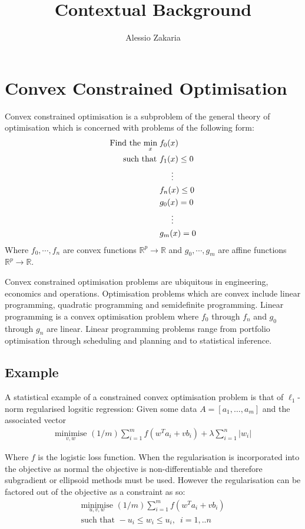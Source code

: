 \documentclass[a4paper,10pt]{article}
\date{}
\author{Alessio Zakaria}
\title{Contextual Background\vspace{-30mm}}
\def\rnum{\mathbb{R}}
\begin{document}
\maketitle
\section{Convex Constrained Optimisation}
Convex constrained optimisation is a subproblem of the general theory of
optimisation which is concerned with problems of the following form:
{\footnotesize
\begin{align*}
    \text{Find the }\underset{x}{\text{min}}\; &f_{0}(x) \\
    \text{  such that }&f_{1}(x) \leq 0 \\
    & \hspace{5mm} \vdots \\
    &f_{n}(x) \leq 0 \\
    &g_{0}(x) = 0 \\
    &\hspace{5mm} \vdots \\
    &g_{m}(x) = 0
\end{align*}}
Where $f_0,\cdots, f_n$ are convex functions $\rnum^{p} \rightarrow \rnum$ and
$g_0, \cdots, g_m$ are affine functions $\rnum^{p} \rightarrow \rnum$.

Convex constrained optimisation problems are ubiquitous in engineering,
economics and operations. Optimisation problems which are convex include linear
programming, quadratic programming and semidefinite programming. Linear
programming is a convex optimisation problem where $f_{0}$ through $f_{n}$ and
$g_{0}$ through $g_{n}$ are linear. Linear programming problems range from
portfolio optimisation through scheduling and planning
 and to statistical inference.
\subsection{Example}
A statistical example of a
constrained convex optimisation problem is that of $\ell_{1}$-norm regularised
logsitic regression: Given some data $A = [a_{1},\dots,a_{m}]$ and the
associated vector 
\begin{align*}
    \underset{v, w}{\text{minimise}} \,\, (1/m)\sum_{i=1}^{m}f(w^{T}a_{i} + vb_{i})
    + \lambda\sum_{i=1}^{n}|w_{i}|
\end{align*}

Where $f$ is the logistic loss function. When the regularisation is incorporated
into the objective as normal the objective is non-differentiable and therefore
subgradient or ellipsoid methods must be used. However the regularisation can be
factored out of the objective as a constraint as so:
\begin{align*}
    \underset{u, v, w}{\text{minimise}} \,\, (1/m)\sum_{i=1}^{m}f(w^{T}a_{i} +
    vb_{i}) \\
    \text{such that } -u_{i} \leq w_{i} \leq u_{i}, \,\,\, i=1,..n
\end{align*}
\end{document}

